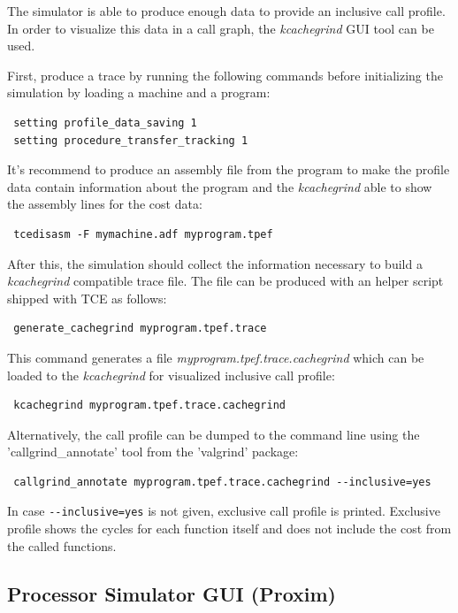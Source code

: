 \documentclass[twoside]{tceusermanual}
\begin{document}
The simulator is able to produce enough data to provide an inclusive call 
profile. In order to visualize this data in a call graph, the \textit{kcachegrind}
GUI tool can be used.

First, produce a trace by running the following commands
before initializing the simulation by loading a machine and a program:

\begin{verbatim}
 setting profile_data_saving 1
 setting procedure_transfer_tracking 1
\end{verbatim}

It's recommend to produce an assembly file from the program to make the
profile data contain information about the program and the 
\textit{kcachegrind} able to show the assembly lines for the cost data:

\begin{verbatim}
 tcedisasm -F mymachine.adf myprogram.tpef
\end{verbatim}

After this, the simulation should collect the information necessary to build
a \textit{kcachegrind} compatible trace file. The file can be produced with an
helper script shipped with TCE as follows:

\begin{verbatim}
 generate_cachegrind myprogram.tpef.trace
\end{verbatim}

This command generates a file \textit{myprogram.tpef.trace.cachegrind} which 
can be loaded to the \textit{kcachegrind} for visualized inclusive call
profile:

\begin{verbatim}
 kcachegrind myprogram.tpef.trace.cachegrind
\end{verbatim}

Alternatively, the call profile can be dumped to the command line using
the 'callgrind\_annotate' tool from the 'valgrind' package:

\begin{verbatim}
 callgrind_annotate myprogram.tpef.trace.cachegrind --inclusive=yes
\end{verbatim}

In case \verb|--inclusive=yes| is not given, exclusive call profile is printed.
Exclusive profile shows the cycles for each function itself and does not
include the cost from the called functions.


\subsection{Processor Simulator GUI (Proxim)}
\label{section:proxim}
\end{document}
